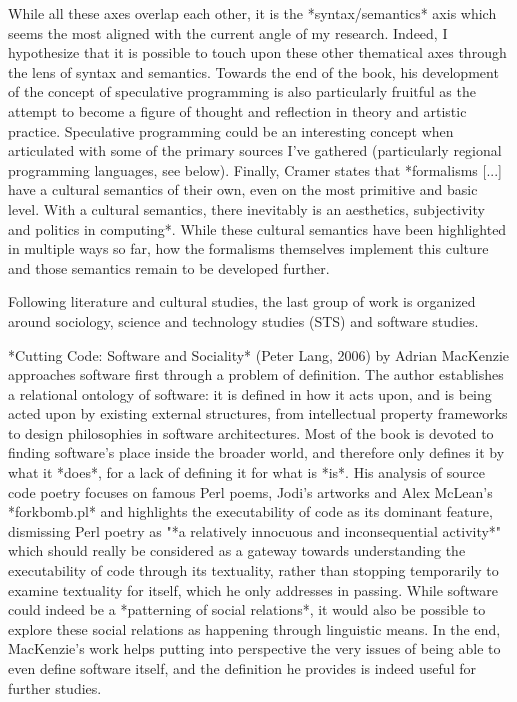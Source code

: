  While all these axes overlap each other, it is the *syntax/semantics* axis which seems the most aligned with the current angle of my research. Indeed, I hypothesize that it is possible to touch upon these other thematical axes through the lens of syntax and semantics. Towards the end of the book, his development of the concept of speculative programming is also particularly fruitful as the attempt to become a figure of thought and reflection in theory and artistic practice. Speculative programming could be an interesting concept when articulated with some of the primary sources I've gathered (particularly regional programming languages, see below). Finally, Cramer states that *formalisms [...] have a cultural semantics of their own, even on the most primitive and basic level. With a cultural semantics, there inevitably is an aesthetics, subjectivity and politics in computing*. While these cultural semantics have been highlighted in multiple ways so far, how the formalisms themselves implement this culture and those semantics remain to be developed further.

Following literature and cultural studies, the last group of work is organized around sociology, science and technology studies (STS) and software studies.

*Cutting Code: Software and Sociality* (Peter Lang, 2006) by Adrian MacKenzie approaches software first through a problem of definition. The author establishes a relational ontology of software: it is defined in how it acts upon, and is being acted upon by existing external structures, from intellectual property frameworks to design philosophies in software architectures. Most of the book is devoted to finding software's place inside the broader world, and therefore only defines it by what it *does*, for a lack of defining it for what is *is*. His analysis of source code poetry focuses on famous Perl poems, Jodi's artworks and Alex McLean's *forkbomb.pl* and highlights the executability of code as its dominant feature, dismissing Perl poetry as "*a relatively innocuous and inconsequential activity*" which should really be considered as a gateway towards understanding the executability of code through its textuality, rather than stopping temporarily to examine textuality for itself, which he only addresses in passing. While software could indeed be a *patterning of social relations*, it would also be possible to explore these social relations as happening through linguistic means. In the end, MacKenzie's work helps putting into perspective the very issues of being able to even define software itself, and the definition he provides is indeed useful for further studies.

